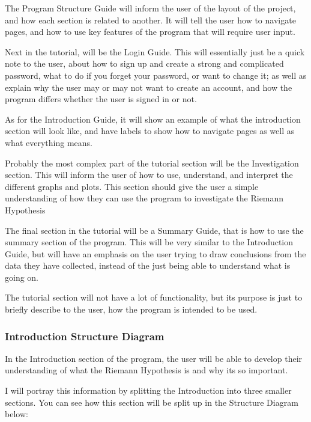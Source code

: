 \documentclass{article}
\begin{document}
The Program Structure Guide will inform the user of the layout of the project, and how each section is related to another. It will tell the user how to navigate pages, and how to use key features of the program that will require user input.

Next in the tutorial, will be the Login Guide. This will essentially just be a quick note to the user, about how to sign up and create a strong and complicated password, what to do if you forget your password, or want to change it; as well as explain why the user may or may not want to create an account, and how the program differs whether the user is signed in or not.

As for the Introduction Guide, it will show an example of what the introduction section will look like, and have labels to show how to navigate pages as well as what everything means.

Probably the most complex part of the tutorial section will be the Investigation section. This will inform the user of how to use, understand, and interpret the different graphs and plots. This section should give the user a simple understanding of how they can use the program to investigate the Riemann Hypothesis

The final section in the tutorial will be a Summary Guide, that is how to use the summary section of the program. This will be very similar to the Introduction Guide, but will have an emphasis on the user trying to draw conclusions from the data they have collected, instead of the just being able to understand what is going on.

The tutorial section will not have a lot of functionality, but its purpose is just to briefly describe to the user, how the program is intended to be used.

\clearpage

\subsubsection{Introduction Structure Diagram}
In the Introduction section of the program, the user will be able to develop their understanding of what the Riemann Hypothesis is and why its so important.

I will portray this information by splitting the Introduction into three smaller sections. You can see how this section will be split up in the Structure Diagram below:
\end{document}
